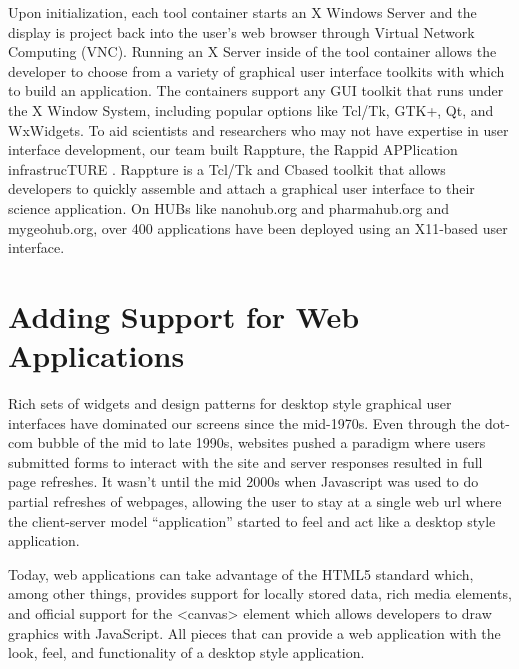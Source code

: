 \documentclass[conference]{../sty/IEEEtran}
\newcommand\CC{C\nolinebreak[4]\hspace{-.05em}\raisebox{.4ex}{\relsize{-3}{\textbf{++}}}\hspace{.25em}}
\begin{document}
Upon initialization, each tool container starts an X Windows Server and the
display is project back into the user's web browser through Virtual Network
Computing (VNC).  Running an X Server inside of the tool container allows the
developer to choose from a variety of graphical user interface toolkits with
which to build an application. The containers support any GUI toolkit that runs
under the X Window System, including popular options like Tcl/Tk, GTK+, Qt, and
WxWidgets.  To aid scientists and researchers who may not have expertise in
user interface development, our team built Rappture, the Rappid APPlication
infrastrucTURE \cite{rappture}.  Rappture is a Tcl/Tk and \CC based toolkit
that allows developers to quickly assemble and attach a graphical user
interface to their science application. On HUBs like nanohub.org and
pharmahub.org and mygeohub.org, over 400 applications have been deployed using
an X11-based user interface.




\section {Adding Support for Web Applications}

Rich sets of widgets and design patterns for desktop style graphical user
interfaces have dominated our screens since the mid-1970s. Even through the
dot-com bubble of the mid to late 1990s, websites pushed a paradigm where users
submitted forms to interact with the site and server responses resulted in full
page refreshes. It wasn't until the mid 2000s when Javascript was used to do
partial refreshes of webpages, allowing the user to stay at a single web url
where the client-server model ``application'' started to feel and act like a
desktop style application.

Today, web applications can take advantage of the HTML5 standard which, among
other things, provides support for locally stored data, rich media elements,
and official support for the <canvas> element which allows developers to draw
graphics with JavaScript. All pieces that can provide a web application with
the look, feel, and functionality of a desktop style application.
\end{document}
